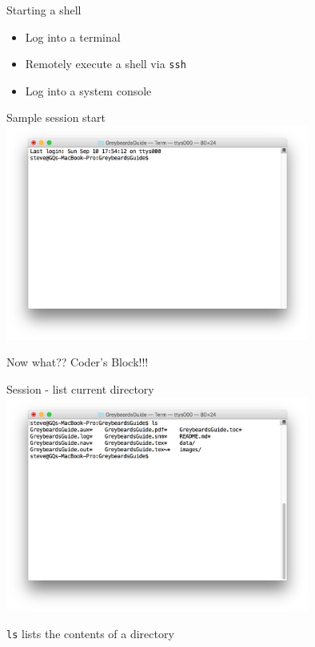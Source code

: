 \documentclass[t]{beamer}
\begin{document}
\begin{frame}{Starting a shell}
  \begin{itemize}
  \item Log into a terminal
  \item Remotely execute a shell via \texttt{ssh}
  \item Log into a system console
  \end{itemize}
  \note{}
\end{frame}

\begin{frame}{Sample session start}
  \includegraphics[width=10cm,scale=0.4]{images/newtty-1.png}

  Now what?? Coder's Block!!!
  \note{}
\end{frame}

\begin{frame}{Session - list current directory}
  \includegraphics[width=10cm,scale=0.4]{images/newtty-2.png}

  \texttt{ls} lists the contents of a directory
  \note{}
\end{frame}
\end{document}
